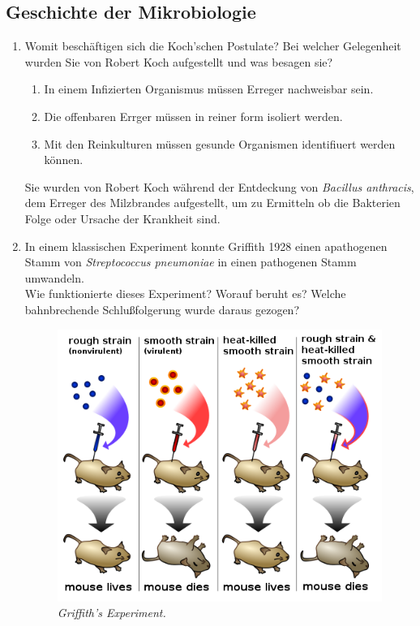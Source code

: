 \subsection*{Geschichte der Mikrobiologie}
\begin{enumerate}
	\item Womit beschäftigen sich die Koch’schen Postulate?
	Bei welcher Gelegenheit wurden Sie von Robert Koch aufgestellt und was besagen sie? \hfill \vspace{4mm}

	\begin{enumerate}[label=\arabic*)]
		\item In einem Infizierten Organismus müssen Erreger nachweisbar sein.
		\item Die offenbaren Errger müssen in reiner form isoliert werden.
		\item Mit den Reinkulturen müssen gesunde Organismen identifiuert werden können.
	\end{enumerate}
	Sie wurden von Robert Koch während der Entdeckung von \emph{Bacillus anthracis},
	dem Erreger des Milzbrandes aufgestellt,
	um zu Ermitteln ob die Bakterien Folge oder Ursache der Krankheit sind.	
	

	\item In einem klassischen Experiment konnte Griffith 1928 einen apathogenen Stamm von
	\emph{Streptococcus pneumoniae} in einen pathogenen Stamm umwandeln.\\
	Wie funktionierte dieses Experiment? Worauf beruht es? 
	Welche bahnbrechende Schlußfolgerung wurde daraus gezogen? \hfill \vspace{4mm}
	
	\begin{figure}[ht!]
	\leavevmode
	\begin{center}
	\includegraphics[scale=0.47]{./pictures/griffith_exp_500}
	\end{center}
	\caption{\slshape{Griffith's Experiment.}}
	\label{fig:griffith}
	\end{figure}


\end{enumerate}
